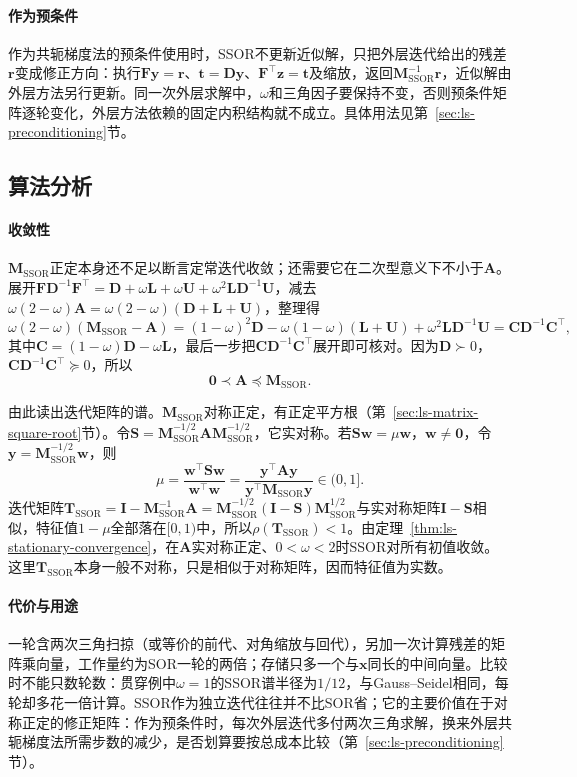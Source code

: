 \paragraph{作为预条件}
作为共轭梯度法的预条件使用时，SSOR不更新近似解，只把外层迭代给出的残差$\bm r$变成修正方向：执行$\bm F\bm y=\bm r$、$\bm t=\bm D\bm y$、$\bm F^\top\bm z=\bm t$及缩放，返回$\bm M_{\mathrm{SSOR}}^{-1}\bm r$，近似解由外层方法另行更新。同一次外层求解中，$\omega$和三角因子要保持不变，否则预条件矩阵逐轮变化，外层方法依赖的固定内积结构就不成立。具体用法见第~\ref{sec:ls-preconditioning}节。

\subsection{算法分析}

\paragraph{收敛性}
$\bm M_{\mathrm{SSOR}}$正定本身还不足以断言定常迭代收敛；还需要它在二次型意义下不小于$\bm A$。展开$\bm F\bm D^{-1}\bm F^\top=\bm D+\omega\bm L+\omega\bm U+\omega^2\bm L\bm D^{-1}\bm U$，减去$\omega(2-\omega)\bm A=\omega(2-\omega)(\bm D+\bm L+\bm U)$，整理得
\[
\omega(2-\omega)(\bm M_{\mathrm{SSOR}}-\bm A)
=(1-\omega)^2\bm D-\omega(1-\omega)(\bm L+\bm U)+\omega^2\bm L\bm D^{-1}\bm U
=\bm C\bm D^{-1}\bm C^\top ,
\]
其中$\bm C=(1-\omega)\bm D-\omega\bm L$，最后一步把$\bm C\bm D^{-1}\bm C^\top$展开即可核对。因为$\bm D\succ0$，$\bm C\bm D^{-1}\bm C^\top\succeq0$，所以
\[
\bm 0\prec\bm A\preceq\bm M_{\mathrm{SSOR}} .
\]

由此读出迭代矩阵的谱。$\bm M_{\mathrm{SSOR}}$对称正定，有正定平方根（第~\ref{sec:ls-matrix-square-root}节）。令$\bm S=\bm M_{\mathrm{SSOR}}^{-1/2}\bm A\bm M_{\mathrm{SSOR}}^{-1/2}$，它实对称。若$\bm S\bm w=\mu\bm w$，$\bm w\neq\bm0$，令$\bm y=\bm M_{\mathrm{SSOR}}^{-1/2}\bm w$，则
\[
\mu=\frac{\bm w^\top\bm S\bm w}{\bm w^\top\bm w}=\frac{\bm y^\top\bm A\bm y}{\bm y^\top\bm M_{\mathrm{SSOR}}\bm y}\in(0,1].
\]
迭代矩阵$\bm T_{\mathrm{SSOR}}=\bm I-\bm M_{\mathrm{SSOR}}^{-1}\bm A=\bm M_{\mathrm{SSOR}}^{-1/2}(\bm I-\bm S)\bm M_{\mathrm{SSOR}}^{1/2}$与实对称矩阵$\bm I-\bm S$相似，特征值$1-\mu$全部落在$[0,1)$中，所以$\rho(\bm T_{\mathrm{SSOR}})<1$。由定理~\ref{thm:ls-stationary-convergence}，在$\bm A$实对称正定、$0<\omega<2$时SSOR对所有初值收敛。这里$\bm T_{\mathrm{SSOR}}$本身一般不对称，只是相似于对称矩阵，因而特征值为实数。

\paragraph{代价与用途}
一轮含两次三角扫掠（或等价的前代、对角缩放与回代），另加一次计算残差的矩阵乘向量，工作量约为SOR一轮的两倍；存储只多一个与$\bm x$同长的中间向量。比较时不能只数轮数：贯穿例中$\omega=1$的SSOR谱半径为$1/12$，与Gauss--Seidel相同，每轮却多花一倍计算。SSOR作为独立迭代往往并不比SOR省；它的主要价值在于对称正定的修正矩阵：作为预条件时，每次外层迭代多付两次三角求解，换来外层共轭梯度法所需步数的减少，是否划算要按总成本比较（第~\ref{sec:ls-preconditioning}节）。

